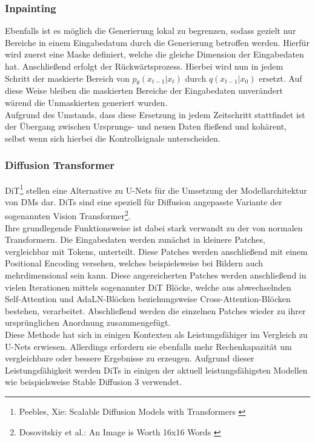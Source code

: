 \subsubsection{Inpainting}

Ebenfalls ist es möglich die Generierung lokal zu begrenzen, sodass gezielt nur Bereiche in einem Eingabedatum durch die Generierung betroffen werden. Hierfür wird zuerst eine Maske definiert, welche die gleiche Dimension der Eingabedaten hat. Anschließend erfolgt der Rückwärtsprozess. Hierbei wird nun in jedem Schritt der maskierte Bereich von $p_\theta(x_{t-1} | x_{t})$ durch $q(x_{t-1}|x_0)$ ersetzt. Auf diese Weise bleiben die maskierten Bereiche der Eingabedaten unverändert wärend die Unmaskierten generiert wurden. \\
Aufgrund des Umstands, dass diese Ersetzung in jedem Zeitschritt stattfindet ist der Übergang zwischen Ursprungs- und neuen Daten fließend und kohärent, selbst wenn sich hierbei die Kontrollsignale unterscheiden.

\subsubsection{Diffusion Transformer}
\label{subsubsec:DiT}

\ac{DiT}\footnote{
    Peebles, Xie: Scalable Diffusion Models with Transformers
    \cite{peebles2023scalable}
} stellen eine Alternative zu U-Nets für die Umsetzung der Modellarchitektur von \ac{DM}s dar. \ac{DiT}s sind eine speziell für Diffusion angepasste Variante der sogenannten Vision Transformer\footnote{
    Dosovitskiy et al.: An Image is Worth 16x16 Words 
    \cite{dosovitskiy2021imageworth16x16words}
}.\\
Ihre grundlegende Funktionsweise ist dabei stark verwandt zu der von normalen Transformern. Die Eingabedaten werden zunächst in kleinere Patches, vergleichbar mit Tokens, unterteilt. Diese Patches werden anschließend mit einem Positional Encoding versehen, welches beispielsweise bei Bildern auch mehrdimensional sein kann. Diese angereicherten Patches werden anschließend in vielen Iterationen mittels sogenannter \ac{DiT} Blöcke, welche aus abwechselnden Self-Attention und AdaLN-Blöcken beziehungsweise Cross-Attention-Blöcken bestehen, verarbeitet. Abschließend werden die einzelnen Patches wieder zu ihrer ursprünglichen Anordnung zusammengefügt. \\
Diese Methode hat sich in einigen Kontexten als Leistungsfähiger im Vergleich zu U-Nets erwiesen. Allerdings erfordern sie ebenfalls mehr Rechenkapazität um vergleichbare oder bessere Ergebnisse zu erzeugen. Aufgrund dieser Leistungsfähigkeit werden \ac{DiT}s in einigen der aktuell leistungsfähigsten Modellen wie beispielsweise Stable Diffusion 3 verwendet.


